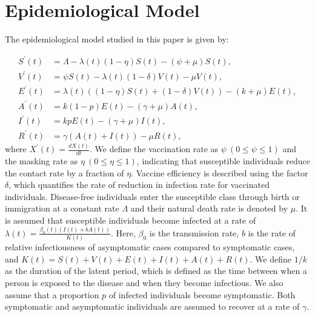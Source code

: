 \documentclass[sigconf,review]{acmart}
\begin{document}



\newpage




\newpage
\appendix
\setcounter{table}{0}
\renewcommand{\thetable}{A\arabic{table}}

\setcounter{figure}{0}
\renewcommand{\thefigure}{A\arabic{figure}}

\section{Epidemiological Model}
\label{supp:epi_model}
The epidemiological model studied in this paper is given by:

\begin{align}
S^{\prime}(t) &= \Lambda - \lambda(t)(1-\eta)S(t) - (\psi + \mu)S(t), \nonumber \\
V^{\prime}(t) &= \psi S(t) - \lambda(t)(1-\delta)V(t) - \mu V(t), \nonumber \\
E^{\prime}(t) &= \lambda(t)\left((1-\eta)S(t) + (1-\delta)V(t)\right)- (k+\mu)E(t), \nonumber \\
A^{\prime}(t) &= k(1-p)E(t) - (\gamma+\mu)A(t), \nonumber \\
I^{\prime}(t) &= kpE(t) - (\gamma+\mu)I(t), \nonumber \\
R^{\prime}(t) &= \gamma (A(t) + I(t)) - \mu R(t), \label{eq_ODE}
\end{align}
where $X^{\prime}(t) = \frac{d X(t)}{d t}$. We define the vaccination rate as $\psi\ (0\leq \psi \leq 1)$ and the masking rate as $\eta\ (0\leq \eta \leq 1)$, indicating that susceptible individuals reduce the contact rate by a fraction of $\eta$. 
Vaccine efficiency is described using the factor $\delta$, which quantifies the rate of reduction in infection rate for vaccinated individuals. 
Disease-free individuals enter the susceptible class through birth or immigration at a constant rate $\Lambda$ and their natural death rate is denoted by $\mu$. It is assumed that susceptible individuals become infected at a rate of $\lambda(t) = \frac{\beta_0(t)(I(t)+bA(t))}{K(t)}$. Here, $\beta_0$ is the transmission rate, $b$ is the rate of relative infectiousness of asymptomatic cases compared to symptomatic cases, and $K(t) = S(t) + V(t) + E(t) + I(t) + A(t)+R(t)$. We define $1/k$ as the duration of the latent period, which is defined as the time between when a person is exposed to the disease and when they become infectious. We also assume that a proportion $p$ of infected individuals become symptomatic.  Both symptomatic and asymptomatic individuals are assumed to recover at a rate of $\gamma$. 
\end{document}
